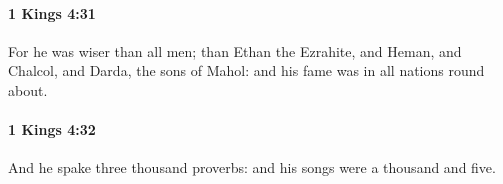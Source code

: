 		\paragraph{1 Kings 4:31} %
			\label{1KINGS-4-31}

			For he was wiser than all men; than Ethan the Ezrahite, and Heman, and Chalcol, and Darda, the sons of Mahol: and his fame was in all nations round about.


		\paragraph{1 Kings 4:32} %
			\label{1KINGS-4-32}

			And he spake three thousand proverbs: and his songs were a thousand and five.


